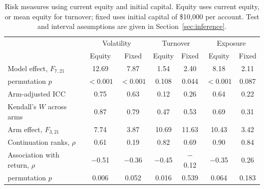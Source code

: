 \begin{table}[ht]
\centering
\footnotesize
\caption{Risk measures using current equity and initial capital.
Equity uses current equity, or mean equity for turnover; fixed uses
initial capital of \$10{,}000 per account. Test and interval assumptions
are given in Section~\ref{sec:inference}.}
\label{tab:voldenom}
\begin{tabular}{lcccccc}
\toprule
 & \multicolumn{2}{c}{Volatility} & \multicolumn{2}{c}{Turnover} & \multicolumn{2}{c}{Exposure} \\
\cmidrule(lr){2-3}\cmidrule(lr){4-5}\cmidrule(lr){6-7}
 & Equity & Fixed & Equity & Fixed & Equity & Fixed \\
\midrule
Model effect, $F_{7,21}$ & 12.69 & 7.87 & 1.54 & 2.40 & 8.18 & 2.11 \\
\quad permutation $p$ & $<0.001$ & $<0.001$ & 0.108 & 0.044 & $<0.001$ & 0.087 \\
Arm-adjusted ICC & 0.75 & 0.63 & 0.12 & 0.26 & 0.64 & 0.22 \\
Kendall's $W$ across arms & 0.87 & 0.79 & 0.47 & 0.53 & 0.69 & 0.31 \\
Arm effect, $F_{3,21}$ & 7.74 & 3.87 & 10.69 & 11.63 & 10.43 & 3.42 \\
Continuation ranks, $\rho$ & 0.61 & 0.19 & 0.82 & 0.69 & 0.90 & 0.84 \\
Association with return, $\rho$ & \ensuremath{-}0.51 & \ensuremath{-}0.36 & \ensuremath{-}0.45 & \ensuremath{-}0.12 & \ensuremath{-}0.35 & 0.26 \\
\quad permutation $p$ & 0.006 & 0.052 & 0.016 & 0.539 & 0.064 & 0.183 \\
\bottomrule
\end{tabular}
\end{table}
